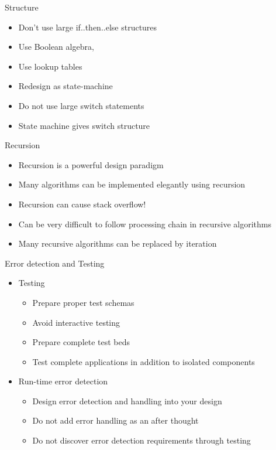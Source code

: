 \documentclass{beamer}
\begin{document}
\begin{frame}{Structure}
\begin{itemize}
\item Don’t use large if..then..else structures
\item Use Boolean algebra,
\item Use lookup tables
\item Redesign as state-machine

\item Do not use large switch statements
\item State machine gives switch structure
\end{itemize}
\end{frame}

\begin{frame}{Recursion}
  \begin{itemize}
  \item Recursion is a powerful design paradigm
  \item Many algorithms can be implemented elegantly using recursion
  \item Recursion can cause stack overflow!
  \item Can be very difficult to follow processing chain in recursive
    algorithms
  \item Many recursive algorithms can be replaced by iteration
  \end{itemize}
\end{frame}


\begin{frame}{Error detection and Testing}
\begin{itemize}
\item Testing
\begin{itemize}
\item Prepare proper test schemas
\item Avoid interactive testing
\item Prepare complete test beds
\item Test complete applications in addition to isolated
components
\end{itemize}
\item Run-time error detection
\begin{itemize}
\item Design error detection and handling into your design
\item Do not add error handling as an after thought
\item Do not discover error detection requirements through
testing
\end{itemize}
\end{itemize}
\end{frame}
\end{document}
